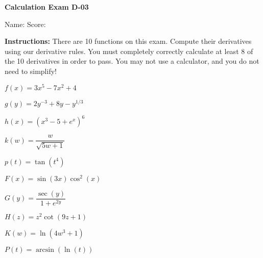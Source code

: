 \documentclass[10pt,answers,addpoints]{exam}
\begin{document}



{\bfseries\large Calculation Exam D-03}
{}%

Name: \makebox[4.18in]{\hrulefill} \quad Score: \makebox[0.75in]{\hrulefill} %


\vspace{0.2in}

\textbf{Instructions: } There are 10 functions on this exam. Compute their derivatives using our derivative rules. You must completely correctly calculate at least 8 of the 10 derivatives in order to pass. You may not use a calculator, and you do not need to simplify! 




\begin{questions}

\question $f(x)=3x^5 - 7x^2 + 4$

\vfill

\question $g(y) = 2y^{-3}+8y-y^{1/3}$

\vfill

\question $h(x) = (x^3-5+e^x)^6$

\vfill


\question $k(w) = \dfrac{w}{\sqrt{5w+1}}$

\vfill

\question $p(t) = \tan(t^4)$

\vfill

\newpage


\question $F(x) = \sin(3x)\cos^2(x)$

\vfill


\question $G(y) = \dfrac{\sec(y)}{1+e^{2y}}$

\vfill

\question $H(z) = z^2\cot(9z+1)$

\vfill

\question $K(w) = \ln(4w^3+1)$

\vfill

\question $P(t) = \arcsin(\ln(t))$

\vfill

\thispagestyle{empty}

\end{questions}
\end{document}
